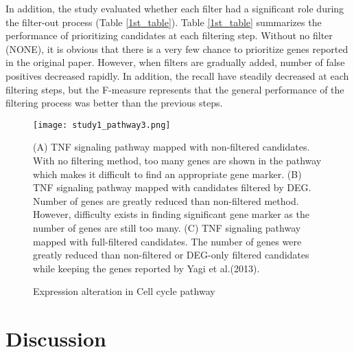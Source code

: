 \documentclass[oneside,phd]{snuthesis}
\begin{document}
In addition, the study evaluated whether each filter had a significant role during the filter-out process (Table \ref{1st_table}). 
Table \ref{1st_table} summarizes the performance of prioritizing candidates at each filtering step. 
Without no filter (NONE), it is obvious that there is a very few chance to prioritize genes reported in the original paper. 
However, when filters are gradually added, number of false positives decreased rapidly. 
In addition, the recall have steadily decreased at each filtering steps, but the F-measure represents that the general performance of the filtering process was better than the previous steps.

\begin{figure*}
\begin{center}
\texttt{[image: study1\_pathway3.png]}
\end{center}
\caption{Expression alteration in Cell cycle pathway}
\scriptsize{
(A) TNF signaling pathway mapped with non-filtered candidates. With no filtering method, too many genes are shown in the pathway which makes it difficult to find an appropriate gene marker. 
(B) TNF signaling pathway mapped with candidates filtered by DEG. Number of genes are greatly reduced than non-filtered method. However, difficulty exists in finding significant gene marker as the number of genes are still too many. 
(C) TNF signaling pathway mapped with full-filtered candidates. The number of genes were greatly reduced than non-filtered or DEG-only filtered candidates while keeping the genes reported by Yagi et al.(2013).}
\label{study1_pathway3}
\end{figure*}




\section{Discussion}
\end{document}
